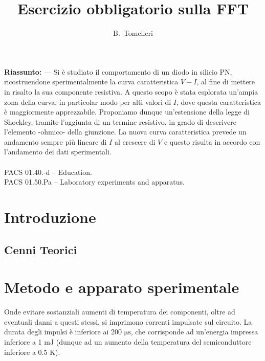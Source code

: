 \documentclass{article}[a4paper, oneside, 11pt]
\title{Esercizio obbligatorio sulla FFT}
\author{B.~Tomelleri \thanksdf}
\begin{document}
\maketitle

\begin{mdframed}
\textbf{Riassunto:} --- Si \`e studiato il comportamento di un diodo in silicio
PN, ricostruendone sperimentalmente la curva caratteristica $V-I$, al fine di
mettere in risalto la sua componente resistiva. A questo scopo \`e stata
esplorata un'ampia zona della curva, in particolar modo per alti valori di
$I$, dove questa caratteristica \`e maggiormente apprezzabile. Proponiamo dunque
un'estensione della legge di Shockley, tramite l'aggiunta di un termine
resistivo, in grado di descrivere l'elemento -ohmico- della giunzione.
La nuova curva caratteristica prevede un andamento sempre pi\`u lineare di $I$
al crescere di $V$ e questo risulta in accordo con l'andamento dei dati
sperimentali.
\\\\
PACS 01.40.-d – Education.\\
PACS 01.50.Pa – Laboratory experiments and apparatus.
\end{mdframed}


\section{Introduzione}

\subsection{Cenni Teorici}

\section{Metodo e apparato sperimentale}
Onde evitare sostanziali aumenti di temperatura dei componenti, oltre ad
eventuali danni a questi stessi, si imprimono correnti impulsate sul circuito. 
La durata degli impulsi \`e inferiore ai 200 $\si{\us}$, che corrisponde ad
un'energia impressa inferiore a 1 $\si{\milli\J}$ (dunque ad un aumento
della temperatura del semiconduttore inferiore a 0.5 $\si{\K}$).
\end{document}

